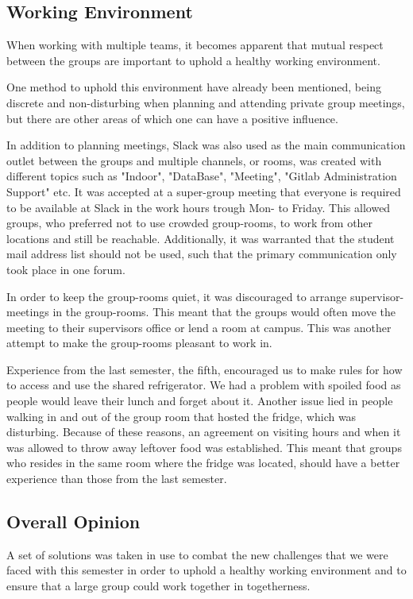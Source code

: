 \subsection*{Working Environment}
When working with multiple teams, it becomes apparent that mutual respect between the groups are important to uphold a healthy working environment.

One method to uphold this environment have already been mentioned, being discrete and non-disturbing when planning and attending private group meetings, but there are other areas of which one can have a positive influence. 

In addition to planning meetings, Slack was also used as the main communication outlet between the groups and multiple channels, or rooms, was created with different topics such as "Indoor", "DataBase", "Meeting", "Gitlab Administration Support" etc. It was accepted at a super-group meeting that everyone is required to be available at Slack in the work hours trough Mon- to Friday. This allowed groups, who preferred not to use crowded group-rooms, to work from other locations and still be reachable. Additionally, it was warranted that the student mail address list should not be used, such that the primary communication only took place in one forum.  

In order to keep the group-rooms quiet, it was discouraged to arrange supervisor-meetings in the group-rooms. This meant that the groups would often move the meeting to their supervisors office or lend a room at campus. This was another attempt to make the group-rooms pleasant to work in.

Experience from the last semester, the fifth, encouraged us to make rules for how to access and use the shared refrigerator. We had a problem with spoiled food as people would leave their lunch and forget about it. Another issue lied in people walking in and out of the group room that hosted %
the fridge, which was disturbing. Because of these reasons, an agreement on visiting hours and when it was allowed to throw away leftover food was established. This meant that groups who resides in the same room where the fridge was located, should have a better experience than those from the last semester.

\subsection*{Overall Opinion}
A set of solutions was taken in use to combat the new challenges that we were faced with this semester in order to uphold a healthy working environment and to ensure that a large group could work together in togetherness. %

